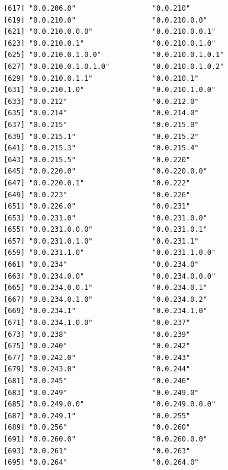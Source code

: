 \documentclass[
  letterpaper,
  DIV=11,
  numbers=noendperiod]{scrreprt}
\begin{document}
\begin{verbatim}
 [617] "0.0.206.0"                  "0.0.210"                   
 [619] "0.0.210.0"                  "0.0.210.0.0"               
 [621] "0.0.210.0.0.0"              "0.0.210.0.0.1"             
 [623] "0.0.210.0.1"                "0.0.210.0.1.0"             
 [625] "0.0.210.0.1.0.0"            "0.0.210.0.1.0.1"           
 [627] "0.0.210.0.1.0.1.0"          "0.0.210.0.1.0.2"           
 [629] "0.0.210.0.1.1"              "0.0.210.1"                 
 [631] "0.0.210.1.0"                "0.0.210.1.0.0"             
 [633] "0.0.212"                    "0.0.212.0"                 
 [635] "0.0.214"                    "0.0.214.0"                 
 [637] "0.0.215"                    "0.0.215.0"                 
 [639] "0.0.215.1"                  "0.0.215.2"                 
 [641] "0.0.215.3"                  "0.0.215.4"                 
 [643] "0.0.215.5"                  "0.0.220"                   
 [645] "0.0.220.0"                  "0.0.220.0.0"               
 [647] "0.0.220.0.1"                "0.0.222"                   
 [649] "0.0.223"                    "0.0.226"                   
 [651] "0.0.226.0"                  "0.0.231"                   
 [653] "0.0.231.0"                  "0.0.231.0.0"               
 [655] "0.0.231.0.0.0"              "0.0.231.0.1"               
 [657] "0.0.231.0.1.0"              "0.0.231.1"                 
 [659] "0.0.231.1.0"                "0.0.231.1.0.0"             
 [661] "0.0.234"                    "0.0.234.0"                 
 [663] "0.0.234.0.0"                "0.0.234.0.0.0"             
 [665] "0.0.234.0.0.1"              "0.0.234.0.1"               
 [667] "0.0.234.0.1.0"              "0.0.234.0.2"               
 [669] "0.0.234.1"                  "0.0.234.1.0"               
 [671] "0.0.234.1.0.0"              "0.0.237"                   
 [673] "0.0.238"                    "0.0.239"                   
 [675] "0.0.240"                    "0.0.242"                   
 [677] "0.0.242.0"                  "0.0.243"                   
 [679] "0.0.243.0"                  "0.0.244"                   
 [681] "0.0.245"                    "0.0.246"                   
 [683] "0.0.249"                    "0.0.249.0"                 
 [685] "0.0.249.0.0"                "0.0.249.0.0.0"             
 [687] "0.0.249.1"                  "0.0.255"                   
 [689] "0.0.256"                    "0.0.260"                   
 [691] "0.0.260.0"                  "0.0.260.0.0"               
 [693] "0.0.261"                    "0.0.263"                   
 [695] "0.0.264"                    "0.0.264.0"                 

\end{verbatim}
\end{document}
